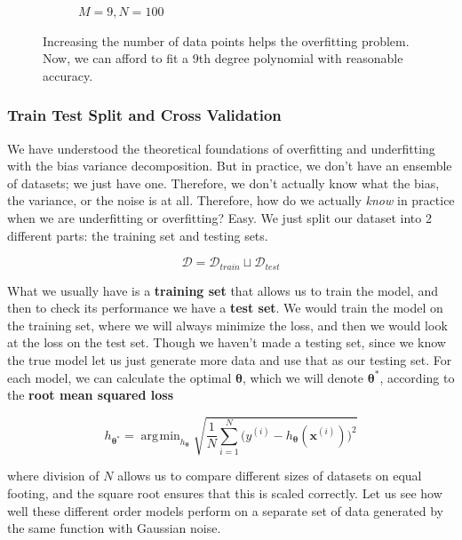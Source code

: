 \documentclass{article}
\DeclareMathOperator*{\argmin}{\arg\!\min}
\theoremstyle{definition}
\begin{document}
\begin{figure}[hbt!]
\begin{subfigure}[b]{0.48\textwidth}
          \caption{$M = 9, N = 100$}
          \label{fig:more_points}
        \end{subfigure}
        \caption{Increasing the number of data points helps the overfitting problem. Now, we can afford to fit a 9th degree polynomial with reasonable accuracy.}
        \label{fig:reducing_overfitting_with_more_samples}
      \end{figure}

    \subsubsection{Train Test Split and Cross Validation}

      We have understood the theoretical foundations of overfitting and underfitting with the bias variance decomposition. But in practice, we don't have an ensemble of datasets; we just have one. Therefore, we don't actually know what the bias, the variance, or the noise is at all. Therefore, how do we actually \textit{know} in practice when we are underfitting or overfitting? Easy. We just split our dataset into 2 different parts: the training set and testing sets. 

        \[\mathcal{D} = \mathcal{D}_{train} \sqcup \mathcal{D}_{test}\]

      What we usually have is a \textbf{training set} that allows us to train the model, and then to check its performance we have a \textbf{test set}. We would train the model on the training set, where we will always minimize the loss, and then we would look at the loss on the test set. Though we haven't made a testing set, since we know the true model let us just generate more data and use that as our testing set. For each model, we can calculate the optimal $\boldsymbol{\theta}$, which we will denote $\boldsymbol{\theta}^\ast$, according to the \textbf{root mean squared loss}

        \[h_{\boldsymbol{\theta}^\ast} = \argmin_{h_{\boldsymbol{\theta}}} \sqrt{ \frac{1}{N} \sum_{i=1}^N \big( y^{(i)} - h_{\boldsymbol{\theta}} (\mathbf{x}^{(i)}) \big)^2 }\]

      where division of $N$ allows us to compare different sizes of datasets on equal footing, and the square root ensures that this is scaled correctly. Let us see how well these different order models perform on a separate set of data generated by the same function with Gaussian noise. 
\end{document}
